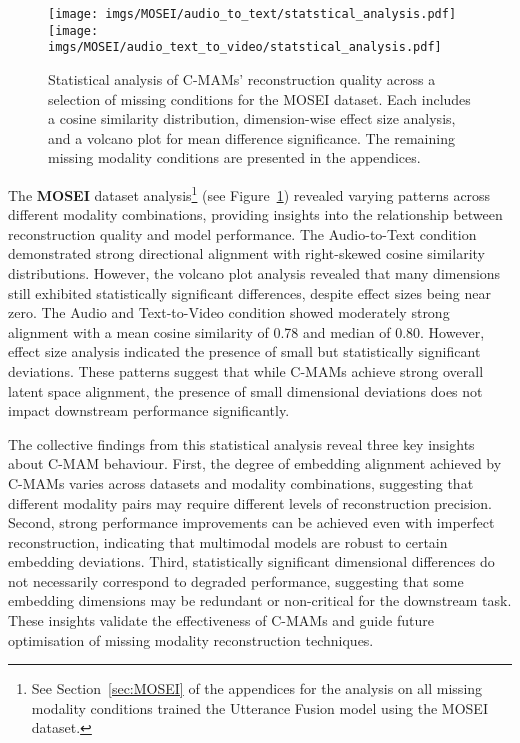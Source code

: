 \begin{figure}[pb!]
    \centering
    \texttt{[image: imgs/MOSEI/audio\_to\_text/statstical\_analysis.pdf]}
    \texttt{[image: imgs/MOSEI/audio\_text\_to\_video/statstical\_analysis.pdf]}
    \caption{Statistical analysis of C-MAMs' reconstruction quality across a selection of missing conditions for the MOSEI dataset. Each includes a cosine similarity distribution, dimension-wise effect size analysis, and a volcano plot for mean difference significance. The remaining missing modality conditions are presented in the appendices.}
    \label{fig:mosei_stats}
\end{figure}

The \textbf{MOSEI} dataset analysis\footnote{See Section~\ref{sec:MOSEI} of the appendices for the analysis on all missing modality conditions trained the Utterance Fusion model \cite{zhao-etal-2021-missing} using the MOSEI dataset.} (see Figure~\ref{fig:mosei_stats}) revealed varying patterns across different modality combinations, providing insights into the relationship between reconstruction quality and model performance. The Audio-to-Text condition demonstrated strong directional alignment with right-skewed cosine similarity distributions. However, the volcano plot analysis revealed that many dimensions still exhibited statistically significant differences, despite effect sizes being near zero. The Audio and Text-to-Video condition showed moderately strong alignment with a mean cosine similarity of 0.78 and median of 0.80. However, effect size analysis indicated the presence of small but statistically significant deviations. These patterns suggest that while C-MAMs achieve strong overall latent space alignment, the presence of small dimensional deviations does not impact downstream performance significantly.

The collective findings from this statistical analysis reveal three key insights about C-MAM behaviour. First, the degree of embedding alignment achieved by C-MAMs varies across datasets and modality combinations, suggesting that different modality pairs may require different levels of reconstruction precision. Second, strong performance improvements can be achieved even with imperfect reconstruction, indicating that multimodal models are robust to certain embedding deviations. Third, statistically significant dimensional differences do not necessarily correspond to degraded performance, suggesting that some embedding dimensions may be redundant or non-critical for the downstream task. These insights validate the effectiveness of C-MAMs and guide future optimisation of missing modality reconstruction techniques.

